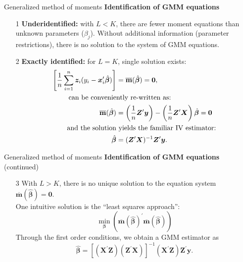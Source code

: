 \documentclass{beamer}
\begin{document}
\begin{frame}{Generalized method of moments}
\textbf{Identification of GMM equations}
\bigskip
\begin{itemize}
    \item[1] \textbf{Underidentified:} with $L < K$, there are fewer moment equations than unknown parameters ($\beta_j$). Without additional information (parameter restrictions), there is no solution to the system of GMM equations.
    \bigskip
    \item[2] \textbf{Exactly identified:} for $L = K$, single solution exists:  
    \begin{equation*}
        \begin{aligned}
        \left[ \frac{1}{n} \sum_{i=1}^n \bm{z}_i (y_i - \bm{x}_i^{\prime}\hat{\bm{\beta}}) \right]
&= \overline{\mathbf{m}}(\hat{\bm{\beta}}) = \bm{0},\\
\textnormal{can be convenie} & \textnormal{ntly~re-written as:}\\
\overline{\mathbf{m}}(\hat{\bm{\beta}}) &= \left( \frac{1}{n} \bm{Z}^{\prime} \bm{y} \right) - \left( \frac{1}{n} \bm{Z}^{\prime} \bm{X} \right) \hat{\bm{\beta}} = \bm{0}\\
\textnormal{and the solution} & \textnormal{~yields the familiar IV estimator:}\\
\hat{\bm{\beta}} &=     (\bm{Z}^{\prime}\bm{X})^{-1} \bm{Z}^{\prime}\bm{y}.
        \end{aligned}
    \end{equation*}
\end{itemize}
\end{frame}
\begin{frame}{Generalized method of moments}
\textbf{Identification of GMM equations} (continued)
\bigskip
\begin{itemize}
    \item[3] With $L > K$, there is no unique solution to the equation system $\overline{\mathbf{m}}(\hat{\bm{\beta}}) = \bm{0}$. \\
    \medskip
    One intuitive solution is the ``least squares approach'':
    $$\underset{\bm{\beta}}{\min}\left(  \overline{\mathbf{m}}(\hat{\bm{\beta}})^{\prime} \overline{\mathbf{m}}(\hat{\bm{\beta}})  \right)$$
    Through the first order conditions, we obtain a GMM estimator as
    $$
    \hat{\bm{\beta}} =\left[ (\bm{X}^{\prime}\bm{Z}) (\bm{Z}^{\prime}\bm{X}) \right]^{-1} (\bm{X}^{\prime}\bm{Z}) \bm{Z}^{\prime}\bm{y}.
    $$
\end{itemize}
\end{frame}
\end{document}
